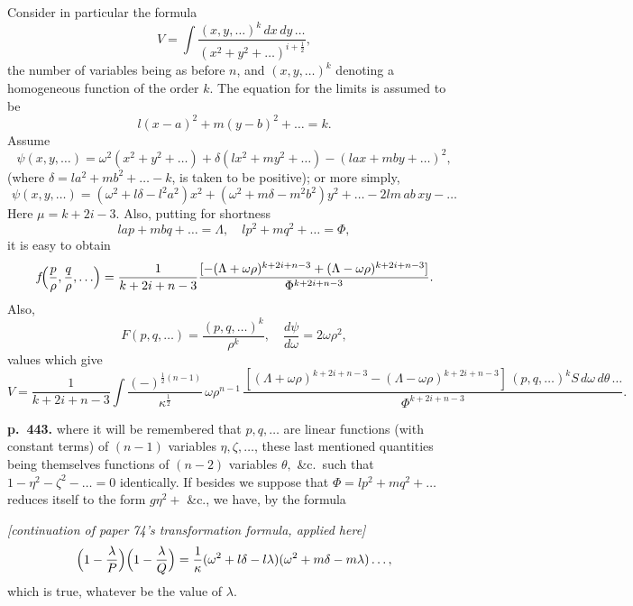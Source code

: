 \documentclass[11pt]{article}
\begin{document}
Consider in particular the formula
\[ V = \int \frac{(x, y, \ldots)^k\,dx\,dy\,\ldots}{(x^2 + y^2 + \ldots)^{i+\frac{1}{2}}}, \]
the number of variables being as before $n$, and $(x, y, \ldots)^k$ denoting a homogeneous function of the order $k$. The equation for the limits is assumed to be
\[ l(x - a)^2 + m(y - b)^2 + \ldots = k. \]
Assume
\[ \psi(x, y, \ldots) = \omega^2(x^2 + y^2 + \ldots) + \delta(lx^2 + my^2 + \ldots) - (lax + mby + \ldots)^2, \]
(where $\delta = la^2 + mb^2 + \ldots - k$, is taken to be positive); or more simply,
\[ \psi(x, y, \ldots) = (\omega^2 + l\delta - l^2 a^2)x^2 + (\omega^2 + m\delta - m^2 b^2)y^2 + \ldots - 2lm\,ab\,xy - \ldots \]
Here $\mu = k + 2i - 3$. Also, putting for shortness
\[ lap + mbq + \ldots = \Lambda,\quad lp^2 + mq^2 + \ldots = \Phi, \]
it is easy to obtain
\[ f\!\Bigl(\frac{p}{\rho},\frac{q}{\rho},\ldots\Bigr) = \frac{1}{k + 2i + n - 3}\frac{[-(\Lambda + \omega\rho)^{k+2i+n-3} + (\Lambda - \omega\rho)^{k+2i+n-3}]}{\Phi^{k+2i+n-3}}. \]
Also,
\[ F(p, q, \ldots) = \frac{(p, q, \ldots)^k}{\rho^k},\quad \frac{d\psi}{d\omega} = 2\omega\rho^2, \]
values which give
\[ V = \frac{1}{k + 2i + n - 3}\int \frac{(-)^{\frac{1}{2}(n-1)}}{\kappa^{\frac{1}{2}}}\,\omega\rho^{n-1}\,\frac{[(\Lambda + \omega\rho)^{k+2i+n-3} - (\Lambda - \omega\rho)^{k+2i+n-3}]\,(p, q, \ldots)^k S\,d\omega\,d\theta\,\ldots}{\Phi^{k+2i+n-3}}. \]

\bigskip
\noindent\textbf{p.~443.} where it will be remembered that $p, q, \ldots$ are linear functions (with constant terms) of $(n-1)$ variables $\eta, \zeta, \ldots$, these last mentioned quantities being themselves functions of $(n-2)$ variables $\theta,$ \&c.\ such that $1 - \eta^2 - \zeta^2 - \ldots = 0$ identically. If besides we suppose that $\Phi = lp^2 + mq^2 + \ldots$ reduces itself to the form $g\eta^2 +$ \&c., we have, by the formula

\noindent\textit{[continuation of paper 74's transformation formula, applied here]}
\[ \Bigl(1 - \frac{\lambda}{P}\Bigr)\Bigl(1 - \frac{\lambda}{Q}\Bigr) = \frac{1}{\kappa}(\omega^2 + l\delta - l\lambda)(\omega^2 + m\delta - m\lambda)\ldots, \]
which is true, whatever be the value of $\lambda$.
\end{document}
